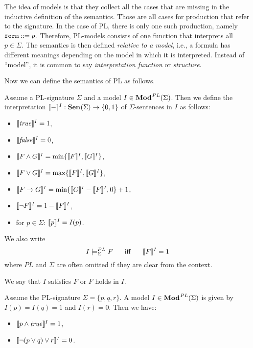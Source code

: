 The idea of models is that they collect all the cases that are missing in the inductive definition of the semantics. Those are all cases for production that refer to the signature. In the case of PL, there is only one such production, namely $\FORM ::= p$. Therefore, PL-models consists of one function that interprets all $p\in\Sigma$. The semantics is then defined \emph{relative to a model}, i.e., a formula has different meanings depending on the model in which it is interpreted.
Instead of ``model'', it is common to say \emph{interpretation function} or \emph{structure}.
\medskip

Now we can define the semantics of PL as follows.
\begin{definition}[Semantics of PL]\label{semantics:pl}
Assume a PL-signature $\Sigma$ and a model $I\in\Mod^{PL}(\Sigma)$. Then we define the interpretation $\semm{-}{I}:\Sen(\Sigma)\arr\{0,1\}$ of $\Sigma$-sentences in $I$ as follows:
\begin{itemize}
\item $\semm{\true}{I} = 1$,
\item $\semm{\false}{I} = 0$,
\item $\semm{F\wedge G}{I} = \min\{\semm{F}{I},\semm{G}{I}\}$,
\item $\semm{F\vee G}{I} = \max\{\semm{F}{I}, \semm{G}{I}\}$,
\item $\semm{F\arr G}{I} = \min\{\semm{G}{I}-\semm{F}{I},0\}+1$,
\item $\semm{\neg F}{I} = 1-\semm{F}{I}$,
\item for $p\in\Sigma$: $\semm{p}{I}=I(p)$.
\end{itemize}
\end{definition}

\begin{notation}[Satisfaction]
We also write \[\moda[PL]{I}{\Sigma}{F} \tb\miff\tb \semm{F}{I}=1\]
where $PL$ and $\Sigma$ are often omitted if they are clear from the context.

We say that $I$ satisfies $F$ or $F$ holds in $I$.
\end{notation}

\begin{example}
Assume the PL-signature $\Sigma=\{p,q,r\}$. A model $I\in\Mod^{PL}(\Sigma)$ is given by $I(p)=I(q)=1$ and $I(r)=0$. Then we have:
\begin{itemize}
\item $\semm{p\wedge\true}{I}=1$,
\item $\semm{\neg(p\vee q)\vee r}{I}=0$.
\end{itemize}
\end{example}

